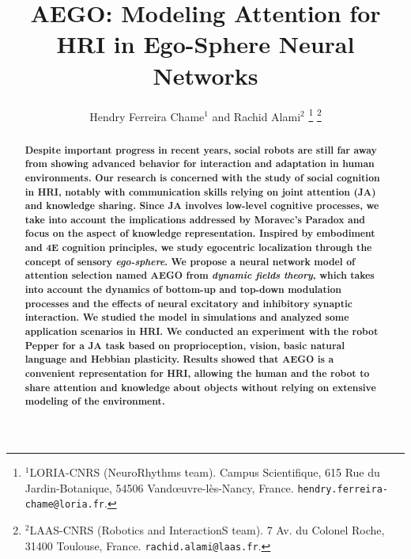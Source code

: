 \documentclass[letterpaper, 10 pt, conference]{ieeeconf}  %
\title{\LARGE \bf
	AEGO: Modeling Attention for HRI in Ego-Sphere Neural Networks
}
\author{Hendry Ferreira Chame$^{1}$ and Rachid Alami$^{2}$%
	\thanks{$^{1}$LORIA-CNRS (NeuroRhythms team). Campus Scientifique, 615 Rue du Jardin-Botanique, 54506 Vand\oe uvre-l\`es-Nancy, France.
		{\tt \small hendry.ferreira-chame@loria.fr}.}%
	\thanks{$^{2}$LAAS-CNRS (Robotics and InteractionS team). 7 Av. du Colonel Roche, 31400 Toulouse, France.
		{\tt \small rachid.alami@laas.fr}.}%
}
\begin{document}
		
	
	\maketitle
	\thispagestyle{empty}
	\pagestyle{empty}
	
	
	\begin{abstract}
		
		
		\small \bf Despite important progress in recent years, social robots are still far away from showing advanced behavior for interaction and adaptation in human environments. Our research is concerned with the study of social cognition in HRI, notably with communication skills relying on joint attention (JA) and knowledge sharing. Since JA involves low-level cognitive processes, we take into account the implications addressed by Moravec's Paradox and focus on the aspect of knowledge representation. Inspired by embodiment and 4E cognition principles, we study egocentric localization through the concept of sensory \textit{ego-sphere}. We propose a neural network model of attention selection named AEGO from \textit{dynamic fields theory}, which takes into account the dynamics of bottom-up and top-down modulation processes and the effects of neural excitatory and inhibitory synaptic interaction. We studied the model in simulations and analyzed some application scenarios in HRI. We conducted an experiment with the robot Pepper for a JA task based on proprioception, vision, basic natural language and Hebbian plasticity. Results showed that AEGO is a convenient representation for HRI, allowing the human and the robot to share attention and knowledge about objects without relying on extensive modeling of the environment.
		

\end{abstract}
\end{document}
